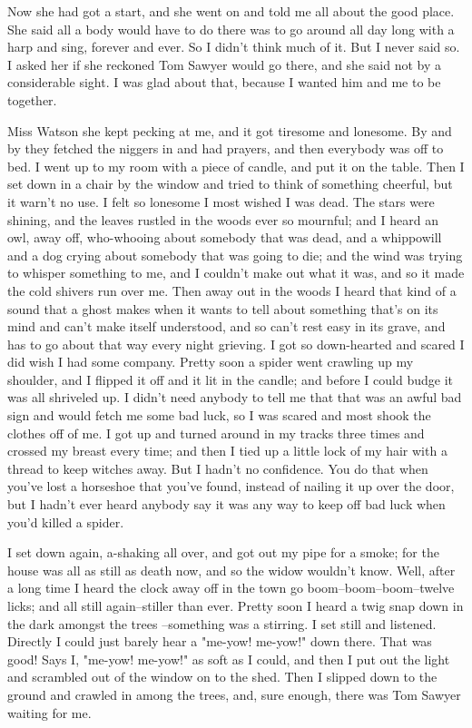 Now she had got a start, and she went on and told me all about the good
place.  She said all a body would have to do there was to go around all
day long with a harp and sing, forever and ever.  So I didn't think much
of it. But I never said so.  I asked her if she reckoned Tom Sawyer would
go there, and she said not by a considerable sight.  I was glad about
that, because I wanted him and me to be together.

Miss Watson she kept pecking at me, and it got tiresome and lonesome.  By
and by they fetched the niggers in and had prayers, and then everybody
was off to bed.  I went up to my room with a piece of candle, and put it
on the table.  Then I set down in a chair by the window and tried to
think of something cheerful, but it warn't no use.  I felt so lonesome I
most wished I was dead.  The stars were shining, and the leaves rustled
in the woods ever so mournful; and I heard an owl, away off, who-whooing
about somebody that was dead, and a whippowill and a dog crying about
somebody that was going to die; and the wind was trying to whisper
something to me, and I couldn't make out what it was, and so it made the
cold shivers run over me. Then away out in the woods I heard that kind of
a sound that a ghost makes when it wants to tell about something that's
on its mind and can't make itself understood, and so can't rest easy in
its grave, and has to go about that way every night grieving.  I got so
down-hearted and scared I did wish I had some company.  Pretty soon a
spider went crawling up my shoulder, and I flipped it off and it lit in
the candle; and before I could budge it was all shriveled up.  I didn't
need anybody to tell me that that was an awful bad sign and would fetch
me some bad luck, so I was scared and most shook the clothes off of me.
I got up and turned around in my tracks three times and crossed my breast
every time; and then I tied up a little lock of my hair with a thread to
keep witches away.  But I hadn't no confidence.  You do that when you've
lost a horseshoe that you've found, instead of nailing it up over the
door, but I hadn't ever heard anybody say it was any way to keep off bad
luck when you'd killed a spider.

I set down again, a-shaking all over, and got out my pipe for a smoke;
for the house was all as still as death now, and so the widow wouldn't
know. Well, after a long time I heard the clock away off in the town go
boom--boom--boom--twelve licks; and all still again--stiller than ever.
Pretty soon I heard a twig snap down in the dark amongst the trees
--something was a stirring.  I set still and listened.  Directly I could
just barely hear a "me-yow! me-yow!" down there.  That was good!  Says I,
"me-yow! me-yow!" as soft as I could, and then I put out the light and
scrambled out of the window on to the shed.  Then I slipped down to the
ground and crawled in among the trees, and, sure enough, there was Tom
Sawyer waiting for me.




